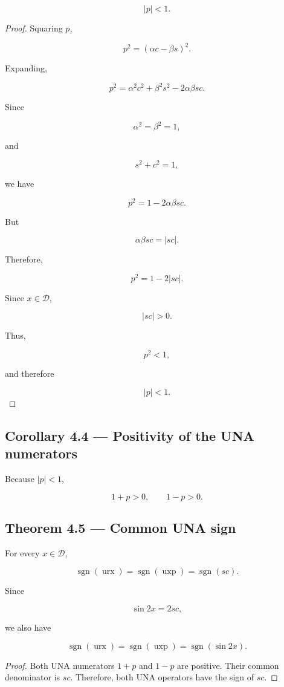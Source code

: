 \documentclass[11pt,oneside,openany]{book}
\newcommand{\PCsubsection}[1]{%
  \subsection*{#1}%
}
\begin{document}
\[
\boxed{|p|<1}.
\]

\begin{proof}
Squaring \(p\),

\[
p^2 = (\alpha c-\beta s)^2.
\]

Expanding,

\[
p^2 = \alpha^2c^2+\beta^2s^2-2\alpha\beta sc.
\]

Since

\[
\alpha^2=\beta^2=1,
\]

and

\[
s^2+c^2=1,
\]

we have

\[
p^2 = 1-2\alpha\beta sc.
\]

But

\[
\alpha\beta sc=|sc|.
\]

Therefore,

\[
p^2=1-2|sc|.
\]

Since \(x\in\mathcal D\),

\[
|sc|>0.
\]

Thus,

\[
p^2<1,
\]

and therefore

\[
|p|<1.
\]

\end{proof}

\PCsubsection{Corollary 4.4 --- Positivity of the UNA numerators}

Because \(|p|<1\),

\[
1+p>0, \qquad 1-p>0.
\]

\PCsubsection{Theorem 4.5 --- Common UNA sign}

For every \(x\in\mathcal D\),

\[
\boxed{ \operatorname{sgn}(\operatorname{urx}) = \operatorname{sgn}(\operatorname{uxp}) = \operatorname{sgn}(sc) }.
\]

Since

\[
\sin 2x=2sc,
\]

we also have

\[
\boxed{ \operatorname{sgn}(\operatorname{urx}) = \operatorname{sgn}(\operatorname{uxp}) = \operatorname{sgn}(\sin 2x) }.
\]

\begin{proof}
Both UNA numerators \(1+p\) and \(1-p\) are positive. Their common denominator is \(sc\). Therefore, both UNA operators have the sign of \(sc\).


\end{proof}
\end{document}
